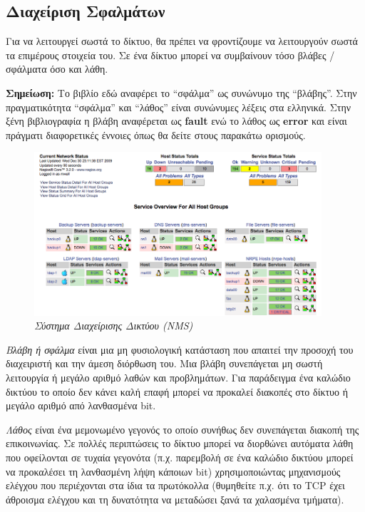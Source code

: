 %
%
\subsection{Διαχείριση Σφαλμάτων}

Για να λειτουργεί σωστά το δίκτυο, θα πρέπει να φροντίζουμε να λειτουργούν σωστά τα επιμέρους στοιχεία του. Σε ένα δίκτυο μπορεί να συμβαίνουν τόσο βλάβες / σφάλματα όσο και λάθη.

\begin{inthebox}
\textbf{Σημείωση:} Το βιβλίο εδώ αναφέρει το ``σφάλμα'' ως συνώνυμο της ``βλάβης''. Στην πραγματικότητα ``σφάλμα'' και ``λάθος'' είναι συνώνυμες λέξεις στα ελληνικά. Στην ξένη βιβλιογραφία η βλάβη αναφέρεται ως \textbf{fault} ενώ το λάθος ως \textbf{error} και είναι πράγματι διαφορετικές έννοιες όπως θα δείτε στους παρακάτω ορισμούς.\\
\end{inthebox}

\begin{figure}[!ht]
 \centering
 \includegraphics[width=0.95\textwidth]{images/chapter7/7-3}
 \caption {\textsl{Σύστημα Διαχείρισης Δικτύου (NMS)}}
 \label{7-3}
\end{figure}

\emph{Βλάβη ή σφάλμα} είναι μια μη φυσιολογική κατάσταση που απαιτεί την προσοχή του διαχειριστή και την άμεση διόρθωση του. Μια βλάβη συνεπάγεται μη σωστή λειτουργία ή μεγάλο αριθμό λαθών και προβλημάτων. Για παράδειγμα ένα καλώδιο δικτύου το οποίο δεν κάνει καλή επαφή μπορεί να προκαλεί διακοπές στο δίκτυο ή μεγάλο αριθμό από λανθασμένα bit.

\emph{Λάθος} είναι ένα μεμονωμένο γεγονός το οποίο συνήθως δεν συνεπάγεται διακοπή της επικοινωνίας. Σε πολλές περιπτώσεις το δίκτυο μπορεί να διορθώνει αυτόματα λάθη που οφείλονται σε τυχαία γεγονότα (π.χ. παρεμβολή σε ένα καλώδιο δικτύου μπορεί να προκαλέσει τη λανθασμένη λήψη κάποιων bit) χρησιμοποιώντας μηχανισμούς ελέγχου που περιέχονται στα ίδια τα πρωτόκολλα (θυμηθείτε π.χ. ότι το TCP έχει άθροισμα ελέγχου και τη δυνατότητα να μεταδώσει ξανά τα χαλασμένα τμήματα).

